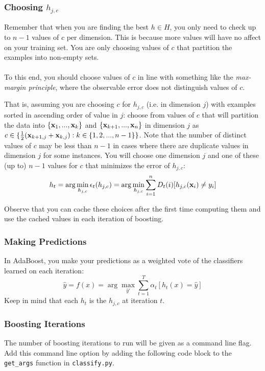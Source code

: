 \documentclass[11pt]{article}
\newcommand{\vx}{{\bf x}}
\newcommand{\vxi}{{\bf x}_i}
\newcommand{\yh}{\hat{y}}
\newcommand{\code}[1]{{\footnotesize \tt #1}}
\begin{document}
	\subsubsection{Choosing $h_{j,c}$}
	Remember that when you are finding the best $h \in H$, you only need to check up to $n-1$ values of $c$ per dimension. This is because more values will have no affect on your training set. You are only choosing values of $c$ that partition the examples into non-empty sets.\\
	\\
	To this end, you should choose values of $c$ in line with something like the \emph{max-margin principle}, where the observable error does not distinguish values of $c$.\begin{samepage}
		That is, assuming you are choosing $c$ for $h_{j,c}$ (i.e. in dimension $j$) with examples sorted in ascending order of value in $j$: choose from values of $c$ that will partition the data into $\{\vx_{1},...,\vx_{k}\}$ and $\{\vx_{k+1},...,\vx_n\}$ in dimension $j$ as $c \in \{ \frac{1}{2}(\vx_{k+1,j} + \vx_{k,j}) : k \in \{1,2,...,n-1\}\}$. Note that the number of distinct values of $c$ may be less than $n-1$ in cases where there are duplicate values in dimension $j$ for some instances. You will choose one dimension $j$ and one of these (up to) $n-1$ values for $c$ that minimizes the error of $h_{j,c}$:\\
		\[
		h_t = \displaystyle \arg\min_{h_{j,c}} { \epsilon_t(h_{j,c}) } = \displaystyle \arg\min_{h_{j,c}} { \sum_{i=1}^n { D_t(i) [ h_{j,c}(\vxi) \neq y_i ] } }
		\]
		
		Observe that you can cache these choices after the first time computing them and use the cached values in each iteration of boosting.
		
	\end{samepage}
	
	\subsubsection{Making Predictions}
	In AdaBoost, you make your predictions as a weighted vote of the classifiers learned on each iteration:
	\[
	\yh = f(x) = \arg \max_{\yh'} \sum_{t=1}^T { \alpha_t [ h_t(x) = \yh ]}
	\]
	Keep in mind that each $h_t$ is the $h_{j,c}$ at iteration $t$.
	
	\subsubsection{Boosting Iterations}
	The number of boosting iterations to run will be given as a command line flag. Add this command line option by adding the following code block to the \code{get\_args} function in \code{classify.py}.
	
\end{document}
